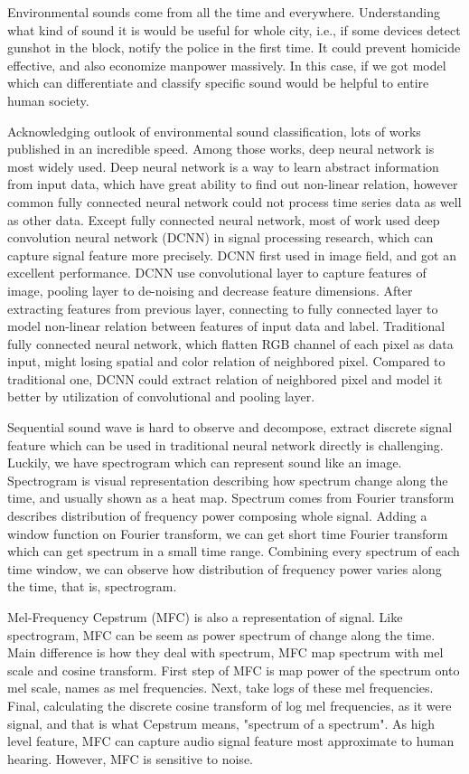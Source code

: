 Environmental sounds come from all the time and everywhere. Understanding what kind of sound it is would be useful for whole city, i.e., if some devices detect gunshot in the block, notify the police in the first time.
It could prevent homicide effective, and also economize manpower massively. 
In this case, if we got model which can differentiate and classify specific sound would be helpful to entire human society. 

Acknowledging outlook of environmental sound classification, lots of works published in an incredible speed. Among those works, deep neural network is most widely used. 
Deep neural network is a way to learn abstract information from input data, which have great ability to find out non-linear relation, however common fully connected neural network could not process time series data as well as other data.
Except fully connected neural network, most of work used deep convolution neural network (DCNN) in signal processing research, which can capture signal feature more precisely. 
DCNN first used in image field, and got an excellent performance. DCNN use convolutional layer to capture features of image, pooling layer to de-noising and decrease feature dimensions. After extracting features from previous layer, connecting to fully connected layer to model non-linear relation between features of input data and label.
Traditional fully connected neural network, which flatten RGB channel of each pixel as data input, might losing spatial and color relation of neighbored pixel.
Compared to traditional one, DCNN could extract relation of neighbored pixel and model it better by utilization of convolutional and pooling layer.

Sequential sound wave is hard to observe and decompose, extract discrete signal feature which can be used in traditional neural network directly is challenging. Luckily, we have spectrogram which can represent sound like an image.
Spectrogram is visual representation describing how spectrum change along the time, and usually shown as a heat map. Spectrum comes from Fourier transform describes distribution of frequency power composing whole signal. Adding a window function on Fourier transform, we can get short time Fourier transform which can get spectrum in a small time range. Combining every spectrum of each time window, we can observe how distribution of frequency power varies along the time, that is, spectrogram.

Mel-Frequency Cepstrum (MFC) is also a representation of signal. Like spectrogram, MFC can be seem as power spectrum of change along the time. Main difference is how they deal with spectrum, MFC map spectrum with mel scale and cosine transform.
First step of MFC is map power of the spectrum onto mel scale, names as mel frequencies. Next, take logs of these mel frequencies. Final, calculating the discrete cosine transform of log mel frequencies, as it were signal, and that is what Cepstrum means, "spectrum of a spectrum".
As high level feature, MFC can capture audio signal feature most approximate to human hearing. However, MFC is sensitive to noise.

